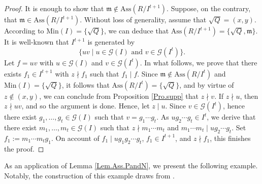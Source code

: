 \documentclass[11pt]{amsart}
\begin{document}
\begin{proof}
It is enough to show that $\mathfrak{m}\notin \mathrm{Ass}(R/I^{t+1})$. Suppose, on the contrary, that $\mathfrak{m}\in \mathrm{Ass}(R/I^{t+1})$. 
Without loss of generality, assume that $\sqrt{Q}=(x,y)$.  According to  $\mathrm{Min}(I)=\{\sqrt{Q}\}$,  we can deduce that   $\mathrm{Ass}(R/I^{t+1})=\{\sqrt{Q}, \mathfrak{m}\}$. It is well-known that  $I^{t+1}$ is generated by 
$$\{uv \mid u\in \mathcal{G}(I) \text { and } v\in \mathcal{G}(I^t)\}.$$ 
 Let $f=uv$ with $u\in \mathcal{G}(I)$ and $v\in \mathcal{G}(I^t)$.  In what follows, we  prove that there exists $f_1\in I^{t+1}$ 
 with  $z\nmid f_1$ such that $f_1\mid f$.  Since  $\mathfrak{m}\notin \mathrm{Ass}(R/I^t)$ and  $\mathrm{Min}(I)=\{\sqrt{Q}\}$,  it follows that 
 $\mathrm{Ass}(R/I^{t})=\{\sqrt{Q}\}$, and by virtue of  $z\notin (x,y)$, we can conclude from Proposition \ref{Pro.supp} that $z\nmid v$. If $z\nmid u$, then  $z\nmid uv$, and so the argument is done. Hence, let $z\mid u$. Since $v\in \mathcal{G}(I^t)$,  hence there exist $g_1, \ldots, g_t \in \mathcal{G}(I)$ such that $v=g_1 \cdots g_t$. As  $ug_2 \cdots g_t \in I^t$,  we derive that there exist $m_1, \ldots, m_t \in \mathcal{G}(I)$ such that $z\nmid m_1 \cdots m_t$ and $m_1 \cdots m_t \mid ug_2 \cdots g_t$.  Set $f_1:=m_1 \cdots m_t g_1$. On account of   $f_1\mid ug_1 g_2 \cdots g_t$, $f_1 \in I^{t+1}$,   and $z\nmid f_1$, this finishes the proof. 
\end{proof}




As an application of  Lemma  \ref{Lem.Ass.PandN},  we present the following example. Notably, the construction of this example draws from \cite[Theorem 4.1]{HH2}. 
\end{document}
